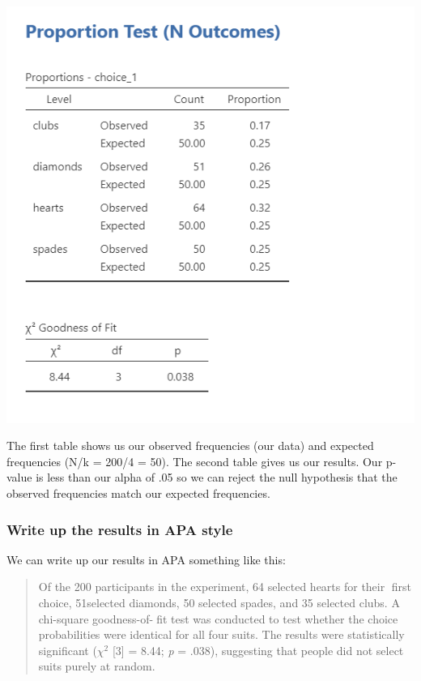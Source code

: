 \documentclass[
]{book}
\begin{document}
\includegraphics{images/09-chi-square/chi-square_results.png}

The first table shows us our observed frequencies (our data) and expected frequencies (N/k = 200/4 = 50). The second table gives us our results. Our p-value is less than our alpha of .05 so we can reject the null hypothesis that the observed frequencies match our expected frequencies.

\hypertarget{write-up-the-results-in-apa-style-3}{%
\subsubsection{Write up the results in APA style}\label{write-up-the-results-in-apa-style-3}}

We can write up our results in APA something like this:

\begin{quote}
Of the 200 participants in the experiment, 64 selected hearts for their first choice, 51selected diamonds, 50 selected spades, and 35 selected clubs. A chi-square goodness-of-fit test was conducted to test whether the choice probabilities were identical for all four suits. The results were statistically significant (\(\chi^2\) {[}3{]} = 8.44; \emph{p} = .038), suggesting that people did not select suits purely at random.
\end{quote}
\end{document}
